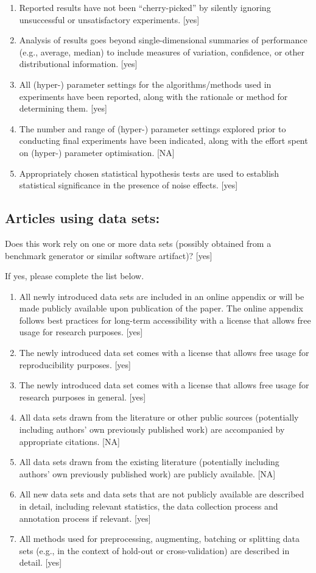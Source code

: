 \begin{enumerate}
    [yes]
    \item
    Reported results have not been ``cherry-picked'' by silently ignoring unsuccessful or unsatisfactory experiments.
    [yes]
    \item
    Analysis of results goes beyond single-dimensional summaries of performance (e.g., average, median) to include measures of variation, confidence, or other distributional information.
    [yes]
    \item
    All (hyper-) parameter settings for
    the algorithms/methods used in experiments have been reported, along with the rationale or method for determining them.
    [yes]
    \item
    The number and range of (hyper-) parameter settings explored prior to conducting final experiments have been indicated, along with the effort spent on (hyper-) parameter optimisation.
    [NA]
    \item
    Appropriately chosen statistical hypothesis tests are used to establish statistical significance
    in the presence of noise effects.
    [yes]
\end{enumerate}


\subsection*{Articles using data sets:}
Does this work rely on one or more data sets (possibly obtained from a benchmark generator or similar software artifact)?
[yes]

If yes, please complete the list below.
\begin{enumerate}
    \item
    All newly introduced data sets
    are included in an online appendix
    or will be made publicly available upon publication of the paper.
    The online appendix follows best practices for long-term accessibility with a license
    that allows free usage for research purposes.
    [yes]
    \item The newly introduced data set comes with a license that
    allows free usage for reproducibility purposes.
    [yes]
    \item The newly introduced data set comes with a license that
    allows free usage for research purposes in general.
    [yes]
    \item All data sets drawn from the literature or other public sources (potentially including authors' own previously published work) are accompanied by appropriate citations.
    [NA]
    \item All data sets drawn from the existing literature (potentially including authors’ own previously published work) are publicly available. [NA]
    \item All new data sets and data sets that are not publicly available are described in detail, including relevant statistics, the data collection process and annotation process if relevant.
    [yes]
    \item
    All methods used for preprocessing, augmenting, batching or splitting data sets (e.g., in the context of hold-out or cross-validation)
    are described in detail. [yes]
\end{enumerate}

